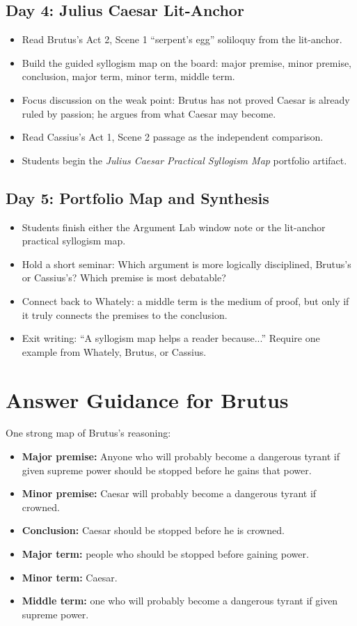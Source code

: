 \documentclass[12pt]{article}
\begin{document}
\subsection*{Day 4: Julius Caesar Lit-Anchor}
\begin{itemize}[leftmargin=*]
\item Read Brutus's Act 2, Scene 1 ``serpent's egg'' soliloquy from the lit-anchor.
\item Build the guided syllogism map on the board: major premise, minor premise, conclusion, major term, minor term, middle term.
\item Focus discussion on the weak point: Brutus has not proved Caesar is already ruled by passion; he argues from what Caesar may become.
\item Read Cassius's Act 1, Scene 2 passage as the independent comparison.
\item Students begin the \textit{Julius Caesar Practical Syllogism Map} portfolio artifact.
\end{itemize}

\subsection*{Day 5: Portfolio Map and Synthesis}
\begin{itemize}[leftmargin=*]
\item Students finish either the Argument Lab window note or the lit-anchor practical syllogism map.
\item Hold a short seminar: Which argument is more logically disciplined, Brutus's or Cassius's? Which premise is most debatable?
\item Connect back to Whately: a middle term is the medium of proof, but only if it truly connects the premises to the conclusion.
\item Exit writing: ``A syllogism map helps a reader because...'' Require one example from Whately, Brutus, or Cassius.
\end{itemize}

\section*{Answer Guidance for Brutus}
One strong map of Brutus's reasoning:
\begin{itemize}[leftmargin=*]
\item \textbf{Major premise:} Anyone who will probably become a dangerous tyrant if given supreme power should be stopped before he gains that power.
\item \textbf{Minor premise:} Caesar will probably become a dangerous tyrant if crowned.
\item \textbf{Conclusion:} Caesar should be stopped before he is crowned.
\item \textbf{Major term:} people who should be stopped before gaining power.
\item \textbf{Minor term:} Caesar.
\item \textbf{Middle term:} one who will probably become a dangerous tyrant if given supreme power.
\end{itemize}
\end{document}

